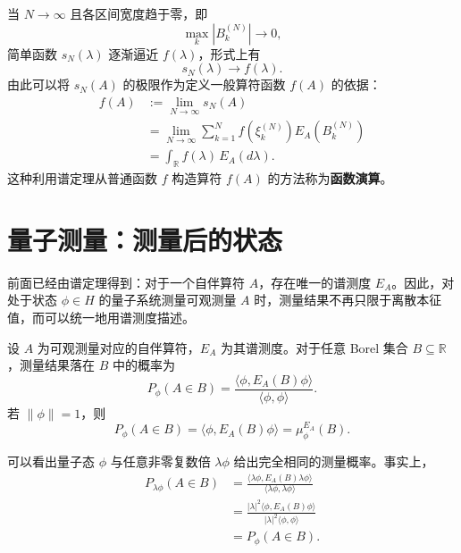 \documentclass[UTF8,a4paper,11pt,openany]{ctexbook}
\begin{document}
当 $N\to\infty$ 且各区间宽度趋于零，即
\[
\max_k |B_k^{(N)}|\to0,
\]
简单函数 $s_N(\lambda)$ 逐渐逼近 $f(\lambda)$，形式上有
\begin{equation}
    s_N(\lambda)\longrightarrow f(\lambda).
\end{equation}
由此可以将 $s_N(A)$ 的极限作为定义一般算符函数 $f(A)$ 的依据：
\begin{align}
    f(A)
    &:=
    \lim_{N\to\infty}s_N(A)
    \nonumber\\
    &=
    \lim_{N\to\infty}
    \sum_{k=1}^{N}
    f\!\left(\xi_k^{(N)}\right)
    E_A\!\left(B_k^{(N)}\right)
    \nonumber\\
    &=
    \int_{\mathbb R}
    f(\lambda)\,E_A(d\lambda).
\end{align}
这种利用谱定理从普通函数 $f$ 构造算符 $f(A)$ 的方法称为\textbf{函数演算}。

\section{量子测量：测量后的状态}

前面已经由谱定理得到：对于一个自伴算符 $A$，存在唯一的谱测度 $E_A$。因此，对处于状态 $\phi\in H$ 的量子系统测量可观测量 $A$ 时，测量结果不再只限于离散本征值，而可以统一地用谱测度描述。

\begin{definition}
设 $A$ 为可观测量对应的自伴算符，$E_A$ 为其谱测度。对于任意 Borel 集合 $B\subseteq\mathbb R$，测量结果落在 $B$ 中的概率为
\begin{equation}
    P_\phi(A\in B)
    =
    \frac{\langle\phi,E_A(B)\phi\rangle}
    {\langle\phi,\phi\rangle}.
\end{equation}
若 $\|\phi\|=1$，则
\begin{equation}
    P_\phi(A\in B)
    =
    \langle\phi,E_A(B)\phi\rangle
    =
    \mu_\phi^{E_A}(B).
\end{equation}
\end{definition}

可以看出量子态 $\phi$ 与任意非零复数倍 $\lambda\phi$ 给出完全相同的测量概率。事实上，
\begin{align}
    P_{\lambda\phi}(A\in B)
    &=
    \frac{
    \langle\lambda\phi,E_A(B)\lambda\phi\rangle
    }{
    \langle\lambda\phi,\lambda\phi\rangle
    }
    \nonumber\\
    &=
    \frac{
    |\lambda|^2\langle\phi,E_A(B)\phi\rangle
    }{
    |\lambda|^2\langle\phi,\phi\rangle
    }
    \nonumber\\
    &=
    P_\phi(A\in B).
\end{align}
\end{document}
